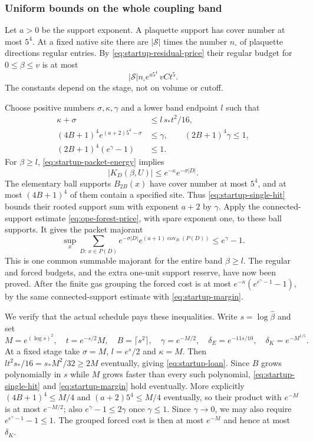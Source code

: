 \subsubsection{Uniform bounds on the whole coupling band}
Let $a>0$ be the support exponent. A plaquette support has cover
number at most $5^4$. At a fixed native site there are
$|\mathcal S|$ times the number $n_\square$ of plaquette directions
regular entries. By \eqref{eq:startup-residual-price} their regular
budget for $0\le\beta\le v$ is at most
\begin{equation}\label{eq:startup-regular-book}
             |\mathcal S|n_\square e^{a5^4}\,vCt^5.
\end{equation}
The constants depend on the stage, not on volume or cutoff.

Choose positive numbers $\sigma,\kappa,\gamma$ and a lower band
endpoint $l$ such that
\begin{align}
 \kappa+\sigma&\le l\,s_*t^2/16,\label{eq:startup-loan}\\
 (4B+1)^4e^{(a+2)5^4-\sigma}&\le\gamma,\qquad
 (2B+1)^4\gamma\le1,\label{eq:startup-single-hit}\\
 (2B+1)^4(e^\gamma-1)&\le1.\label{eq:startup-margin}
\end{align}
For $\beta\ge l$, \eqref{eq:startup-packet-energy} implies
\[
               |K_D(\beta,U)|\le e^{-\kappa}e^{-\sigma|D|}.
\]
The elementary ball supports $B_{2B}(x)$ have cover number at most
$5^4$, and at most $(4B+1)^4$ of them contain a specified site.
Thus \eqref{eq:startup-single-hit} bounds their rooted support sum
with exponent $a+2$ by $\gamma$. Apply the connected-support
estimate \eqref{eq:ope-forest-price}, with spare exponent one, to
these ball supports. It gives the packet majorant
\[
 \sup_x\sum_{D:\,x\in P(D)}
          e^{-\sigma|D|}e^{(a+1)\operatorname{cov}_B(P(D))}
                        \le e^\gamma-1.
\]
This is one common summable majorant for the entire band
$\beta\ge l$. The regular and forced budgets, and the extra
one-unit support reserve, have now been proved. After the
finite gas grouping the forced cost is at most
$e^{-\kappa}(e^{e^\gamma-1}-1)$, by the same connected-support
estimate with \eqref{eq:startup-margin}.

We verify that the actual schedule pays these inequalities. Write
$s=\log\widehat\beta$ and set
\[
 M=e^{(\log s)^2},\quad t=e^{-s/2}M,\quad B=\lceil s^2\rceil,
 \quad \gamma=e^{-M/2},\quad
 \delta_E=e^{-11s/10},\quad \delta_K=e^{-M^{1/5}}.
\]
At a fixed stage take $\sigma=M$, $l=e^s/2$ and $\kappa=M$.
Then $lt^2s_*/16=s_*M^2/32\ge2M$ eventually, giving
\eqref{eq:startup-loan}. Since $B$ grows polynomially in $s$
while $M$ grows faster than every such polynomial,
\eqref{eq:startup-single-hit} and \eqref{eq:startup-margin}
hold eventually. More explicitly $(4B+1)^4\le M/4$ and
$(a+2)5^4\le M/4$ eventually, so their product with
$e^{-M}$ is at most $e^{-M/2}$; also
$e^\gamma-1\le2\gamma$ once $\gamma\le1$.
Since $\gamma\to0$, we may also require
$e^{e^\gamma-1}-1\le1$. The grouped forced cost is then at most
$e^{-M}$ and hence at most $\delta_K$.

